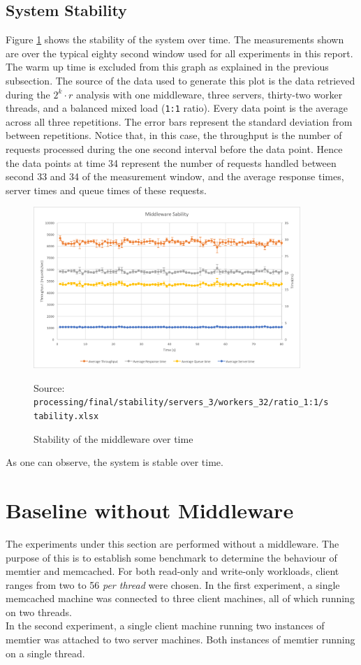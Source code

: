 \documentclass[11pt,a4paper]{article}
\newcommand{\source}[1]{\vspace{-1em}\caption*{\tiny{Source: \texttt{ {#1} }}} }
\begin{document}
\subsection{System Stability}
Figure \ref{png::system_stability} shows the stability of the system over time. The measurements shown are over the typical eighty second window used for all experiments in this report. The warm up time is excluded from this graph as explained in the previous subsection. The source of the data used to generate this plot is the data retrieved during the $2^k\cdot r$ analysis with one middleware, three servers, thirty-two worker threads, and a balanced mixed load (\texttt{1:1} ratio). Every data point is the average across all three repetitions. The error bars represent the standard deviation from between repetitions. Notice that, in this case, the throughput is the number of requests processed during the one second interval before the data point. Hence the data points at time 34 represent the number of requests handled between second 33 and 34 of the measurement window, and the average response times, server times and queue times of these requests.
\begin{figure}[!h]
    \centering
    \includegraphics[width=0.9\textwidth]{processing/graphics/system_stability.png}
    \caption{Stability of the middleware over time}
    \source{processing/final/stability/servers\_3/workers\_32/ratio\_1:1/stability.xlsx}
    \label{png::system_stability}
\end{figure}

As one can observe, the system is stable over time.


\newpage

\section{Baseline without Middleware}
The experiments under this section are performed without a middleware. The purpose of this is to establish some benchmark to determine the behaviour of memtier and memcached. For both read-only and write-only workloads, client ranges from two to 56 \textit{per thread} were chosen. In the first experiment, a single memcached machine was connected to three client machines, all of which running on two threads.\\
\indent In the second experiment, a single client machine running two instances of memtier was attached to two server machines. Both instances of memtier running on a single thread.
\end{document}

